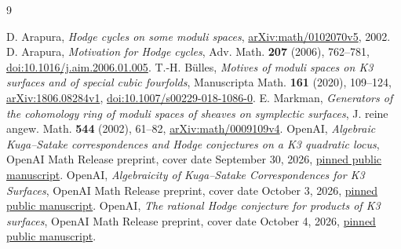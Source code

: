 \documentclass[11pt]{article}
\begin{document}
\begin{thebibliography}{9}
\raggedright
{}
D. Arapura, \emph{Hodge cycles on some moduli spaces},
\href{https://arxiv.org/abs/math/0102070v5}{arXiv:math/0102070v5}, 2002.
D. Arapura, \emph{Motivation for Hodge cycles}, Adv. Math. \textbf{207}
(2006), 762--781, \href{https://doi.org/10.1016/j.aim.2006.01.005}{doi:10.1016/j.aim.2006.01.005}.
T.-H. B\"ulles, \emph{Motives of moduli spaces on K3 surfaces and of special
cubic fourfolds}, Manuscripta Math. \textbf{161} (2020), 109--124,
\href{https://arxiv.org/abs/1806.08284v1}{arXiv:1806.08284v1},
\href{https://doi.org/10.1007/s00229-018-1086-0}{doi:10.1007/s00229-018-1086-0}.
E. Markman, \emph{Generators of the cohomology ring of moduli spaces of
sheaves on symplectic surfaces}, J. reine angew. Math. \textbf{544}
(2002), 61--82, \href{https://arxiv.org/abs/math/0009109v4}{arXiv:math/0009109v4}.
OpenAI, \emph{Algebraic Kuga--Satake correspondences and Hodge conjectures
on a K3 quadratic locus}, OpenAI Math Release preprint, cover date
September 30, 2026, \href{https://github.com/openai/math/blob/adc7f1241b42e322a6451854ab7e4b4c146bf78a/preprints/Algebraic-Kuga-Satake-correspondences-and-Hodge-conjectures-on-a-K3-quadratic-locus-September-30-2026/paper.pdf}{pinned public manuscript}.
OpenAI, \emph{Algebraicity of Kuga--Satake Correspondences for K3 Surfaces},
OpenAI Math Release preprint, cover date October 3, 2026,
\href{https://github.com/openai/math/blob/adc7f1241b42e322a6451854ab7e4b4c146bf78a/preprints/Algebraicity-of-Kuga-Satake-Correspondences-for-K3-Surfaces-October-3-2026/manuscript.pdf}{pinned public manuscript}.
OpenAI, \emph{The rational Hodge conjecture for products of K3 surfaces},
OpenAI Math Release preprint, cover date October 4, 2026,
\href{https://github.com/openai/math/blob/adc7f1241b42e322a6451854ab7e4b4c146bf78a/preprints/The-rational-Hodge-conjecture-for-products-of-K3-surfaces-October-4-2026/hodge-conjecture-products-k3.pdf}{pinned public manuscript}.
\end{thebibliography}
\end{document}
